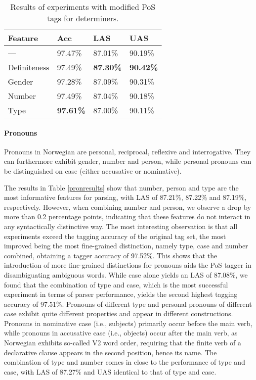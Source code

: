 \documentclass[11pt,a4paper]{article}
\begin{document}
\begin{table}
    \centering
    \smaller[0.5]
    \begin{tabular}{@{}llll@{}}
        \toprule
        \textbf{Feature} & \textbf{Acc} & \textbf{LAS} & \textbf{UAS} \\
        \midrule
        --- & 97.47\% & 87.01\% & 90.19\% \\
        Definiteness & 97.49\% & \textbf{87.30\%} & \textbf{90.42\%} \\
        Gender & 97.28\% & 87.09\% & 90.31\% \\
        Number & 97.49\% & 87.04\% & 90.18\% \\
        Type & \textbf{97.61\%} & 87.00\% & 90.11\% \\
        \bottomrule
    \end{tabular}
    \caption{Results of experiments with modified PoS tags for determiners.}
    \label{detresults}
\end{table}

\paragraph{Pronouns}
Pronouns in Norwegian are personal, reciprocal, reflexive and interrogative.
They can furthermore exhibit gender, number and person, while personal pronouns
can be distinguished on case (either accusative or nominative).

The results in Table \ref{pronresults} show that number, person and type are
the most informative features for parsing, with LAS of 87.21\%, 87.22\% and
87.19\%, respectively. However, when combining number and person, we observe a
drop by more than 0.2 percentage points, indicating that these features do not
interact in any syntactically distinctive way. The most interesting observation
is that all experiments exceed the tagging accuracy of the original tag set,
the most improved being the most fine-grained distinction, namely type, case
and number combined, obtaining a tagger accuracy of 97.52\%. This shows that
the introduction of more fine-grained distinctions for pronouns aids the PoS
tagger in disambiguating ambiguous words. While case alone yields an LAS of
87.08\%, we found that the combination of type and case, which is the most
successful experiment in terms of parser performance, yields the second highest
tagging accuracy of 97.51\%. Pronouns of different type and personal pronouns
of different case exhibit quite different properties and appear in different
constructions. Pronouns in nominative case (i.e., subjects) primarily occur
before the main verb, while pronouns in accusative case (i.e., objects) occur
after the main verb, as Norwegian exhibits so-called V2 word order, requiring
that the finite verb of a declarative clause appears in the second position,
hence its name. The combination of type and number comes in close to the
performance of type and case, with LAS of 87.27\% and UAS identical to that of
type and case.
\end{document}
